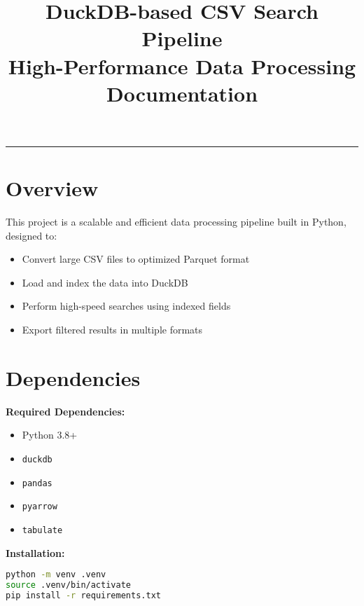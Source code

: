 \documentclass[a4paper,11pt]{article}
\title{
    \vspace{-1in}
    \begin{tcolorbox}[colback=headercolor!10, colframe=headercolor, boxrule=2pt, arc=10pt]
        \centering
        \Huge\textbf{\textcolor{sectioncolor}{DuckDB-based CSV Search Pipeline}}\\
        \vspace{0.5em}
        \Large\textcolor{headercolor}{High-Performance Data Processing Documentation}
    \end{tcolorbox}
}
\begin{document}
\maketitle
\begin{center}
\textcolor{headercolor}{\rule{\linewidth}{2pt}}
\end{center}

\section{Overview}

\begin{tcolorbox}[colback=blue!5, colframe=blue!40!black, title=Project Summary]
This project is a scalable and efficient data processing pipeline built in Python, designed to:
\begin{itemize}[leftmargin=1em]
  \item Convert large CSV files to optimized Parquet format
  \item Load and index the data into DuckDB
  \item Perform high-speed searches using indexed fields
  \item Export filtered results in multiple formats
\end{itemize}
\end{tcolorbox}

\section{Dependencies}

\begin{mdframed}[backgroundcolor=backcolour, linecolor=codeblue, linewidth=2pt]
\textbf{Required Dependencies:}
\begin{itemize}[leftmargin=1em]
  \item Python 3.8+
  \item \texttt{duckdb}
  \item \texttt{pandas}
  \item \texttt{pyarrow}
  \item \texttt{tabulate}
\end{itemize}
\end{mdframed}

\textbf{Installation:}
\begin{lstlisting}[language=bash, caption=Environment Setup]
python -m venv .venv
source .venv/bin/activate
pip install -r requirements.txt
\end{lstlisting}
\end{document}
